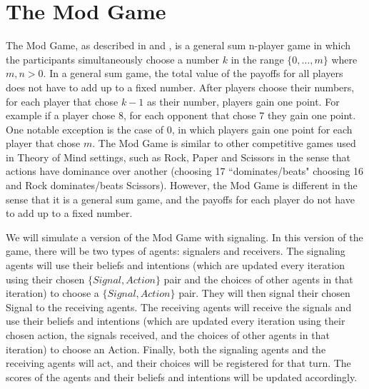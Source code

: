 \section{The Mod Game}\label{sec:mod_game}

The Mod Game, as described in \cite{frey2013cyclic} and \cite{veltman2019training}, is a general sum n-player game in which the participants simultaneously choose a number $k$ in the range $\{0, …, m\}$ where $m, n > 0$. In a general sum game, the total value of the payoffs for all players does not have to add up to a fixed number. After players choose their numbers, for each player that chose $k - 1$ as their number, players gain one point. For example if a player chose 8, for each opponent that chose 7 they gain one point. One notable exception is the case of 0, in which players gain one point for each player that chose $m$. The Mod Game is similar to other competitive games used in Theory of Mind settings, such as Rock, Paper and Scissors in the sense that actions have dominance over another (choosing 17 ``dominates/beats" choosing 16 and Rock dominates/beats Scissors). However, the Mod Game is different in the sense that it is a general sum game, and the payoffs for each player do not have to add up to a fixed number.

We will simulate a version of the Mod Game with signaling. In this version of the game, there will be two types of agents: signalers and receivers. The signaling agents will use their beliefs and intentions (which are updated every iteration using their chosen $\{Signal, Action\}$ pair and the choices of other agents in that iteration) to choose a $\{Signal, Action\}$ pair. They will then signal their chosen Signal to the receiving agents. The receiving agents will receive the signals and use their beliefs and intentions (which are updated every iteration using their chosen action, the signals received, and the choices of other agents in that iteration) to choose an Action. Finally, both the signaling agents and the receiving agents will act, and their choices will be registered for that turn. The scores of the agents and their beliefs and intentions will be updated accordingly.

